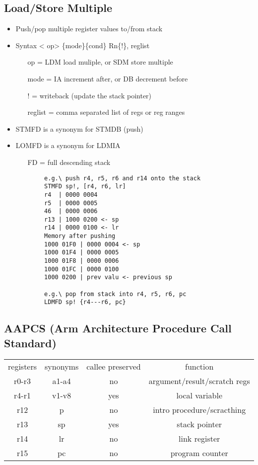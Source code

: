 \documentclass[12pt]{report}
\begin{document}
  \subsection{Load/Store Multiple}
    \begin{itemize}
      \item Push/pop multiple register values to/from stack
      \item Syntax \textless{} op\textgreater{} \{mode\}\{cond\} Rn\{!\},
      reglist
      \begin{itemize}
        \item[op] = LDM load muliple, or SDM store multiple
        \item[mode] = IA increment after, or DB decrement before
        \item[!] = writeback (update the stack pointer)
        \item[reglist] = comma separated list of regs or reg ranges
      \end{itemize}
      \item STMFD is a synonym for STMDB (push)
      \item LOMFD is a synonym for LDMIA
      \begin{itemize}
        \item[FD] = full descending stack
      \end{itemize}
      \begin{lstlisting}
        e.g.\ push r4, r5, r6 and r14 onto the stack
        STMFD sp!, [r4, r6, lr]
        r4  | 0000 0004
        r5  | 0000 0005
        46  | 0000 0006
        r13 | 1000 0200 <- sp
        r14 | 0000 0100 <- lr
        Memory after pushing
        1000 01F0 | 0000 0004 <- sp
        1000 01F4 | 0000 0005
        1000 01F8 | 0000 0006
        1000 01FC | 0000 0100
        1000 0200 | prev valu <- previous sp

        e.g.\ pop from stack into r4, r5, r6, pc
        LDMFD sp! {r4---r6, pc}
      \end{lstlisting}
    \end{itemize}

  \subsection{AAPCS (Arm Architecture Procedure Call Standard)}
    \begin{tabular}{c c c c}
      registers & synonyms & callee preserved & function\\
      r0-r3 & a1-a4   &   no  & argument/result/scratch regs\\
      r4-r1 & v1-v8   &   yes & local variable\\
      r12   & p       &   no  & intro procedure/scracthing\\
      r13   & sp      &   yes & stack pointer\\
      r14   & lr      &   no  & link register\\
      r15   & pc      &   no  & program counter
    \end{tabular}
\end{document}

